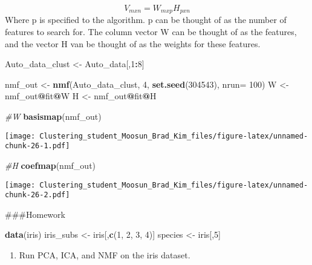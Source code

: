\documentclass[11pt,]{article}
\newenvironment{Shaded}{\begin{snugshade}}{\end{snugshade}}
\newcommand{\CommentTok}[1]{\textcolor[rgb]{0.56,0.35,0.01}{\textit{#1}}}
\newcommand{\DataTypeTok}[1]{\textcolor[rgb]{0.13,0.29,0.53}{#1}}
\newcommand{\DecValTok}[1]{\textcolor[rgb]{0.00,0.00,0.81}{#1}}
\newcommand{\KeywordTok}[1]{\textcolor[rgb]{0.13,0.29,0.53}{\textbf{#1}}}
\newcommand{\NormalTok}[1]{#1}
\newcommand{\OperatorTok}[1]{\textcolor[rgb]{0.81,0.36,0.00}{\textbf{#1}}}
\newcommand{\StringTok}[1]{\textcolor[rgb]{0.31,0.60,0.02}{#1}}
\providecommand{\tightlist}{%
  \setlength{\itemsep}{0pt}\setlength{\parskip}{0pt}}
\begin{document}
\[V_{mxn}=W_{mxp}H_{pxn}\] Where p is specified to the algorithm. p can
be thought of as the number of features to search for. The column vector
W can be thought of as the features, and the vector H van be thought of
as the weights for these features.

\begin{Shaded}
\begin{Highlighting}[]
\NormalTok{Auto_data_clust <-}\StringTok{ }\NormalTok{Auto_data[,}\DecValTok{1}\OperatorTok{:}\DecValTok{8}\NormalTok{]}

\NormalTok{nmf_out <-}\StringTok{ }\KeywordTok{nmf}\NormalTok{(Auto_data_clust, }\DecValTok{4}\NormalTok{, }\KeywordTok{set.seed}\NormalTok{(}\DecValTok{304543}\NormalTok{), }\DataTypeTok{nrun=} \DecValTok{100}\NormalTok{)}
\NormalTok{W <-}\StringTok{ }\NormalTok{nmf_out}\OperatorTok{@}\NormalTok{fit}\OperatorTok{@}\NormalTok{W}
\NormalTok{H <-}\StringTok{ }\NormalTok{nmf_out}\OperatorTok{@}\NormalTok{fit}\OperatorTok{@}\NormalTok{H}

\CommentTok{#W}
\KeywordTok{basismap}\NormalTok{(nmf_out)}
\end{Highlighting}
\end{Shaded}

\texttt{[image: Clustering\_student\_Moosun\_Brad\_Kim\_files/figure-latex/unnamed-chunk-26-1.pdf]}

\begin{Shaded}
\begin{Highlighting}[]
\CommentTok{#H}
\KeywordTok{coefmap}\NormalTok{(nmf_out)}
\end{Highlighting}
\end{Shaded}

\texttt{[image: Clustering\_student\_Moosun\_Brad\_Kim\_files/figure-latex/unnamed-chunk-26-2.pdf]}
\newpage

\#\#\#Homework

\begin{Shaded}
\begin{Highlighting}[]
\KeywordTok{data}\NormalTok{(iris)}
\NormalTok{iris_subs <-}\StringTok{ }\NormalTok{iris[,}\KeywordTok{c}\NormalTok{(}\DecValTok{1}\NormalTok{, }\DecValTok{2}\NormalTok{, }\DecValTok{3}\NormalTok{, }\DecValTok{4}\NormalTok{)]}
\NormalTok{species <-}\StringTok{ }\NormalTok{iris[,}\DecValTok{5}\NormalTok{]}
\end{Highlighting}
\end{Shaded}

\begin{enumerate}
\def\labelenumi{\arabic{enumi}.}
\tightlist
\item
  Run PCA, ICA, and NMF on the iris dataset.
\end{enumerate}
\end{document}

